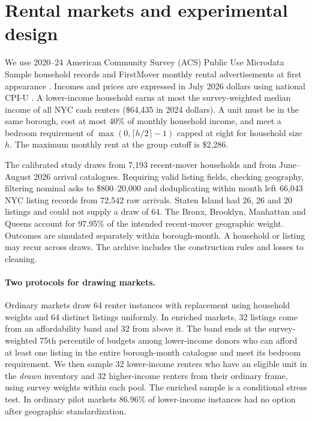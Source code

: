 \section{Rental markets and experimental design}
We use 2020--24 American Community Survey (ACS) Public Use Microdata Sample household records and FirstMover monthly rental advertisements at first appearance \citep{acs,firstmover}. Incomes and prices are expressed in July 2026 dollars using national CPI-U \citep{cpi}. A lower-income household earns at most the survey-weighted median income of all NYC cash renters (\$64,435 in 2024 dollars). A unit must be in the same borough, cost at most 40\% of monthly household income, and meet a bedroom requirement of $\max(0,\lceil h/2\rceil-1)$ capped at eight for household size $h$. The maximum monthly rent at the group cutoff is \$2,286.

The calibrated study draws from 7,193 recent-mover households and from June--August 2026 arrival catalogues. Requiring valid listing fields, checking geography, filtering nominal asks to \$800--20,000 and deduplicating within month left 66,043 NYC listing records from 72,542 raw arrivals. Staten Island had 26, 26 and 20 listings and could not supply a draw of 64. The Bronx, Brooklyn, Manhattan and Queens account for 97.95\% of the intended recent-mover geographic weight. Outcomes are simulated separately within borough-month. A household or listing may recur across draws. The archive includes the construction rules and losses to cleaning.

\paragraph{Two protocols for drawing markets.}
Ordinary markets draw 64 renter instances with replacement using household weights and 64 distinct listings uniformly. In enriched markets, 32 listings come from an affordability band and 32 from above it. The band ends at the survey-weighted 75th percentile of budgets among lower-income donors who can afford at least one listing in the entire borough-month catalogue and meet its bedroom requirement. We then sample 32 lower-income renters who have an eligible unit in the \emph{drawn} inventory and 32 higher-income renters from their ordinary frame, using survey weights within each pool. The enriched sample is a conditional stress test. In ordinary pilot markets 86.96\% of lower-income instances had no option after geographic standardization.

